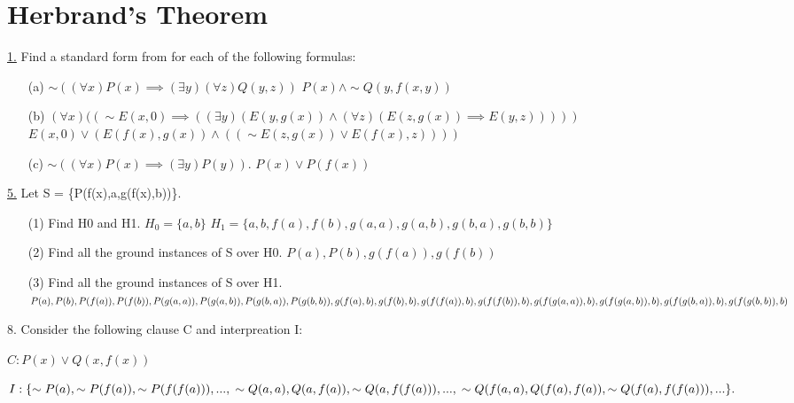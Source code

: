 \section{Herbrand's Theorem}

\underline{1.} Find a standard form from for each of the following formulas:
\begin{itemize}
 \item[(a)] $ \sim ((\forall x) P(x) \implies (\exists y) (\forall z) Q(y,z)) $ \newline
$ P(x) \wedge \sim Q(y, f(x, y)) $
 \item[(b)] $ (\forall x)((\sim E(x,0)\implies((\exists y)(E(y,g(x)) \wedge (\forall z)(E(z,g(x)) \implies E(y,z))))) $ \newline
$ E(x,0) \vee (E(f(x),g(x)) \wedge ( (\sim E(z,g(x)) \vee E(f(x),z))) )$
 \item[(c)] $ \sim((\forall x)P(x) \implies(\exists y)P(y)) $.
 \newline
$ P(x) \vee P(f(x)) $
\end{itemize}

\underline{5.} Let S = \{P(f(x),a,g(f(x),b))\}.
\begin{itemize}
 \item[(1)] Find H0 and H1. \newline
$ H_0 = \{ a, b \} $ \newline
$ H_1 = \{ a, b, f(a), f(b), g(a, a), g(a, b), g(b, a), g(b, b) \} $
 \item[(2)] Find all the ground instances of S over H0. \newline
$ P(a), P(b), g(f(a)), g(f(b)) $
 \item[(3)] Find all the ground instances of S over H1. \newline
$ P(a), P(b), P(f(a)), P(f(b)), P(g(a,a)), P(g(a,b)), P(g(b,a)), P(g(b,b)),\\
g(f(a),b), g(f(b),b), g(f(f(a)),b), g(f(f(b)),b), g(f(g(a,a)),b),\\
g(f(g(a,b)),b),g(f(g(b,a)),b), g(f(g(b,b)),b)$
\end{itemize}

8. Consider the following clause C and interpreation I:

$ C: P(x) \vee Q(x,f(x)) $

$I:\\
\{ \sim P(a), \sim P(f(a)), \sim P(f(f(a))), ...,\\
\sim Q(a,a), Q(a, f(a)), \sim Q(a,f(f(a))), ...,\\
\sim Q(f(a,a),Q(f(a),f(a)), \sim Q(f(a), f(f(a))), ... \}.$

